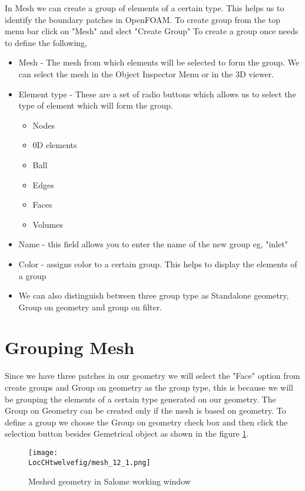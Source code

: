 In Mesh we can create a group of elements of a certain type. This helps us to identify the boundary patches in OpenFOAM. To create group from the top menu bar click on "Mesh" and slect "Create Group" To create a group once needs to define the following, \newline
\begin{itemize}
\item Mesh - The mesh from which elements will be selected to form the group. We can select the mesh in the Object Inspector Menu or in the 3D viewer.
\item Element type - These are a set of radio buttons which allows us to select the type of element which will form the group.
\begin{itemize}
\item Nodes
\item 0D elements
\item Ball
\item Edges
\item Faces
\item Volumes
\end{itemize}
\item Name - this field allows you to enter the name of the new group eg, "inlet"
\item Color - assigns color to a certain group. This helps to display the elements of a group
\item We can also distinguish between three group type as Standalone geometry, Group on geometry and group on filter.
\end{itemize}
 
\section{Grouping Mesh}
Since we have three patches in our geometry we will select the "Face" option from create groups and Group on geometry as the group type, this is because we will be grouping the elements of a certain type generated on our geometry. The Group on Geometry can be created only if the mesh is based on geometry. To define a group we choose the Group on geometry check box and then click the selection button besides Gemetrical object as shown in the figure \ref{mesh_1}. 

\begin{figure}[h]  
\centering
\texttt{[image: \\LocCHtwelvefig/mesh\_12\_1.png]}
\caption{Meshed geometry in Salome working window}
\label{mesh_1}
\end{figure} 

